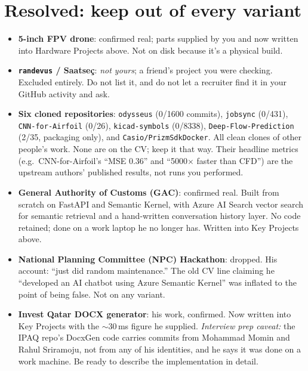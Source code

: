 \documentclass[10pt,a4paper]{article}
\begin{document}

\section*{Resolved: keep out of every variant}

\begin{itemize}
    \item \textbf{5-inch FPV drone}: confirmed real; parts supplied by you and
    now written into Hardware Projects above. Not on disk because it's a physical
    build.

    \item \textbf{\texttt{randevus} / Saatse\c{c}}: \emph{not yours}; a
    friend's project you were checking. Excluded entirely. Do not list it, and
    do not let a recruiter find it in your GitHub activity and ask.

    \item \textbf{Six cloned repositories}: \texttt{odysseus} (0/1600 commits),
    \texttt{jobsync} (0/431), \texttt{CNN-for-Airfoil} (0/26),
    \texttt{kicad-symbols} (0/8338), \texttt{Deep-Flow-Prediction} (2/35,
    packaging only), and \texttt{Casio/PrizmSdkDocker}. All clean clones of other
    people's work. None are on the CV; keep it that way. Their headline metrics
    (e.g.\ CNN-for-Airfoil's ``MSE 0.36'' and ``5000$\times$ faster than CFD'')
    are the upstream authors' published results, not runs you performed.

    \item \textbf{General Authority of Customs (GAC)}: confirmed real. Built from
    scratch on FastAPI and Semantic Kernel, with Azure AI Search vector search
    for semantic retrieval and a hand-written conversation history layer. No code
    retained; done on a work laptop he no longer has. Written into Key Projects above.

    \item \textbf{National Planning Committee (NPC) Hackathon}: dropped. His
    account: ``just did random maintenance.'' The old CV line claiming he
    ``developed an AI chatbot using Azure Semantic Kernel'' was inflated to the
    point of being false. Not on any variant.

    \item \textbf{Invest Qatar DOCX generator}: his work, confirmed. Now written
    into Key Projects with the $\sim$30\,ms figure he supplied. \emph{Interview
    prep caveat:} the IPAQ repo's DocxGen code carries commits from Mohammad
    Momin and Rahul Sriramoju, not from any of his identities, and he says it was
    done on a work machine. Be ready to describe the implementation in detail.


\end{itemize}
\end{document}
